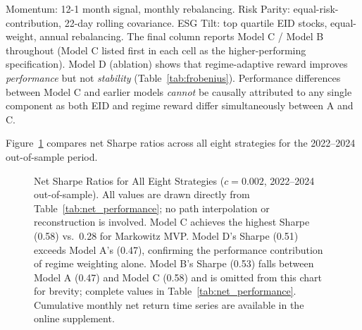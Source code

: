 \documentclass[12pt]{article}
\begin{document}
\begin{table}[t]
\begin{tablenotes}
\footnotesize
\item Momentum: 12-1 month signal, monthly rebalancing. Risk Parity:
equal-risk-contribution, 22-day rolling covariance. ESG Tilt: top
quartile EID stocks, equal-weight, annual rebalancing. The final column
reports Model C / Model B throughout (Model C listed first in each cell
as the higher-performing specification). Model D (ablation) shows that
regime-adaptive reward improves \emph{performance} but not
\emph{stability} (Table~\ref{tab:frobenius}). Performance differences
between Model C and earlier models \emph{cannot} be causally attributed
to any single component as both EID and regime reward differ
simultaneously between A and C.
\end{tablenotes}
\end{table}

Figure~\ref{fig:cum_returns} compares net Sharpe ratios across all eight
strategies for the 2022--2024 out-of-sample period.

\begin{figure}[H]
\centering
{}
\caption{Net Sharpe Ratios for All Eight Strategies
($c=0.002$, 2022--2024 out-of-sample). All values are drawn directly
from Table~\ref{tab:net_performance}; no path interpolation or
reconstruction is involved. Model C achieves the highest Sharpe (0.58)
vs.\ 0.28 for Markowitz MVP. Model D's Sharpe (0.51) exceeds Model A's
(0.47), confirming the performance contribution of regime weighting alone.
Model B's Sharpe (0.53) falls between Model A (0.47) and Model C (0.58)
and is omitted from this chart for brevity; complete values in
Table~\ref{tab:net_performance}. Cumulative monthly net return time
series are available in the online supplement.}
\label{fig:cum_returns}
\end{figure}
\end{document}
